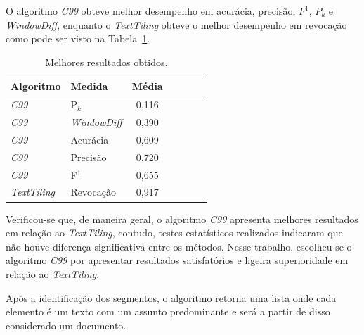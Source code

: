 O algoritmo \textit{C99} obteve melhor desempenho em acurácia, precisão, $F^1$, $P_k$ e \textit{WindowDiff}, enquanto o \textit{TextTiling} obteve o melhor desempenho em revocação como pode ser visto na Tabela~\ref{tab:configfinal}. 


\begin{table}[!h]
	\centering

	\begin{tabular}{|l|l|c|c|c|c|c|} \hline
		\textbf{Algoritmo} & 
		\textbf{Medida} & 
		\textbf{Média}\\	\hline

	\textit{C99} & P$_k$			   & 0,116 \\ \hline
	\textit{C99} & \textit{WindowDiff} & 0,390 \\ \hline
	\textit{C99} & Acurácia			   & 0,609 \\ \hline
	\textit{C99} & Precisão			   & 0,720 \\ \hline
	\textit{C99} & F$^1$			   & 0,655 \\ \hline
	\textit{TextTiling} &	Revocação  & 0,917 \\ \hline

	\end{tabular}
	
	\caption{Melhores resultados obtidos.}
	\label{tab:configfinal}
\end{table}





Verificou-se que, de maneira geral, o algoritmo \textit{C99} apresenta melhores resultados em relação ao \textit{TextTiling}, contudo, testes estatísticos realizados indicaram que não houve diferença significativa entre os métodos. Nesse trabalho, escolheu-se o algoritmo \textit{C99} por apresentar resultados satisfatórios e ligeira superioridade em relação ao \textit{TextTiling}. 






Após a identificação dos segmentos, o algoritmo retorna uma lista onde cada elemento é um texto com um assunto predominante e será a partir de disso considerado um documento.







